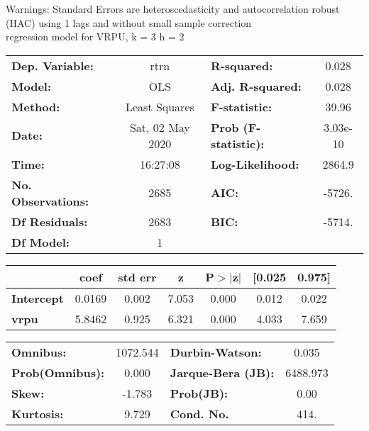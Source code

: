 Warnings: \newline
 [1] Standard Errors are heteroscedasticity and autocorrelation robust (HAC) using 1 lags and without small sample correction\\ 

regression model for VRPU, k = 3 h = 2\begin{center}
\begin{tabular}{lclc}
\toprule
\textbf{Dep. Variable:}    &       rtrn       & \textbf{  R-squared:         } &     0.028   \\
\textbf{Model:}            &       OLS        & \textbf{  Adj. R-squared:    } &     0.028   \\
\textbf{Method:}           &  Least Squares   & \textbf{  F-statistic:       } &     39.96   \\
\textbf{Date:}             & Sat, 02 May 2020 & \textbf{  Prob (F-statistic):} &  3.03e-10   \\
\textbf{Time:}             &     16:27:08     & \textbf{  Log-Likelihood:    } &    2864.9   \\
\textbf{No. Observations:} &        2685      & \textbf{  AIC:               } &    -5726.   \\
\textbf{Df Residuals:}     &        2683      & \textbf{  BIC:               } &    -5714.   \\
\textbf{Df Model:}         &           1      & \textbf{                     } &             \\
\bottomrule
\end{tabular}
\begin{tabular}{lcccccc}
                   & \textbf{coef} & \textbf{std err} & \textbf{z} & \textbf{P$> |$z$|$} & \textbf{[0.025} & \textbf{0.975]}  \\
\midrule
\textbf{Intercept} &       0.0169  &        0.002     &     7.053  &         0.000        &        0.012    &        0.022     \\
\textbf{vrpu}      &       5.8462  &        0.925     &     6.321  &         0.000        &        4.033    &        7.659     \\
\bottomrule
\end{tabular}
\begin{tabular}{lclc}
\textbf{Omnibus:}       & 1072.544 & \textbf{  Durbin-Watson:     } &    0.035  \\
\textbf{Prob(Omnibus):} &   0.000  & \textbf{  Jarque-Bera (JB):  } & 6488.973  \\
\textbf{Skew:}          &  -1.783  & \textbf{  Prob(JB):          } &     0.00  \\
\textbf{Kurtosis:}      &   9.729  & \textbf{  Cond. No.          } &     414.  \\
\bottomrule
\end{tabular}
\end{center}

